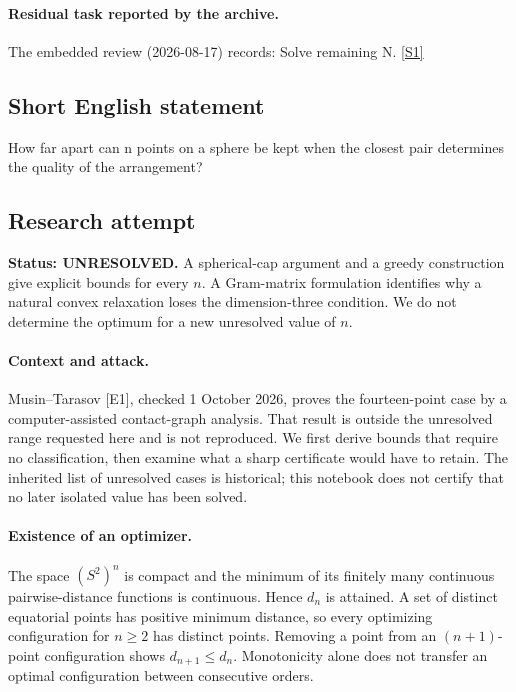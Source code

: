 \documentclass[11pt,a4paper]{article}
\newcommand{\sref}[2]{\hyperlink{source:#1:#2}{[S#2]}}
\begin{document}
\paragraph{Residual task reported by the archive.}

The embedded review (2026-08-17) records: Solve remaining N. \sref{1372}{1}

\subsection{Short English statement}

How far apart can n points on a sphere be kept when the closest pair determines the quality of the arrangement?

\subsection{Research attempt}
\textbf{Status: UNRESOLVED.} A spherical-cap argument and a greedy construction give explicit bounds for every $n$. A Gram-matrix formulation identifies why a natural convex relaxation loses the dimension-three condition. We do not determine the optimum for a new unresolved value of $n$.

\paragraph{Context and attack.}
Musin--Tarasov [E1], checked 1 October 2026, proves the fourteen-point case by a computer-assisted contact-graph analysis. That result is outside the unresolved range requested here and is not reproduced. We first derive bounds that require no classification, then examine what a sharp certificate would have to retain. The inherited list of unresolved cases is historical; this notebook does not certify that no later isolated value has been solved.

\paragraph{Existence of an optimizer.}
The space $(S^2)^n$ is compact and the minimum of its finitely many continuous pairwise-distance functions is continuous. Hence $d_n$ is attained. A set of distinct equatorial points has positive minimum distance, so every optimizing configuration for $n\ge2$ has distinct points. Removing a point from an $(n+1)$-point configuration shows $d_{n+1}\le d_n$. Monotonicity alone does not transfer an optimal configuration between consecutive orders.
\end{document}
